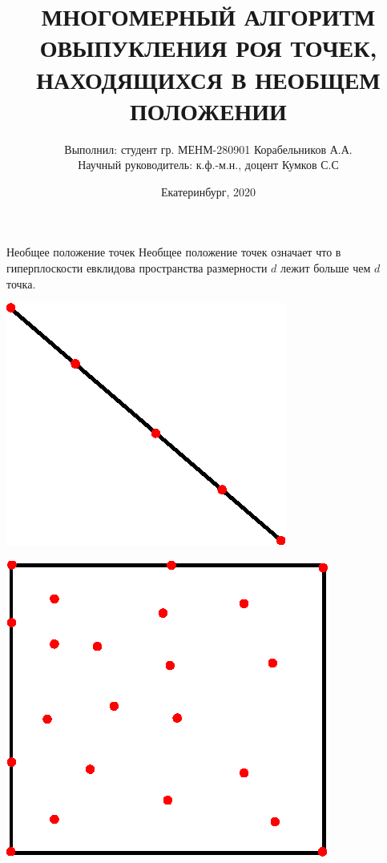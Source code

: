 \documentclass[]{beamer} %
\begin{document}
\title{МНОГОМЕРНЫЙ АЛГОРИТМ ОВЫПУКЛЕНИЯ РОЯ ТОЧЕК, НАХОДЯЩИХСЯ В НЕОБЩЕМ ПОЛОЖЕНИИ}
\author[Корабельников А.А.]{\scriptsize Выполнил: студент гр. МЕНМ-280901 Корабельников А.А.\\Научный руководитель: к.ф.-м.н., доцент Кумков С.С}
\date{Екатеринбург, 2020}
\frame{\titlepage}
\begin{frame}{Необщее положение точек}
   Необщее положение точек означает что в гиперплоскости евклидова пространства размерности $d$ лежит больше чем $d$ точка.\\
   \vfill
    \begin{minipage}{.49\textwidth}
    \centering
    \includegraphics[width=0.5\linewidth]{line.eps}
  \end{minipage}
  \begin{minipage}{.49\textwidth}
    \centering
    \includegraphics[width=0.5\linewidth]{cube1.eps}
  \end{minipage}
\end{frame}
\end{document}
